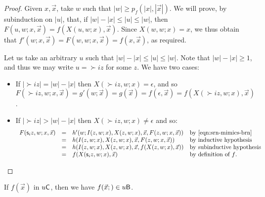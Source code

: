 \documentclass{lmcs}
\begin{document}
\begin{proof}
	Given $x,\vec x$, take $w$ such that $|w|\geq p_f  (|x|,|\vec x|)$. 
	We will prove, by subinduction on $|u|$, that, if $|w|-|x|\leq |u|\leq |w|$, then $F(u,w;x,\vec x) = f(X(u,w;x),\vec x)$. Since $X(w,w;x) = x$, we thus obtain that $f'(w;x,\vec x) = F(w,w;x,\vec x) = f(x,\vec x)$, as required.
	
	Let us take an arbitrary $u$ such that $|w|-|x|\leq |u|\leq |w|$. Note that  $|w|-|x|\geq 1$, and thus we may write $u=\succ i z$ for some $z$. We have two cases:
	\begin{itemize}
		\item
		If $|\succ i z| = |w|-|x|$ then $X(\succ i  z,w;x) = \epsilon$, and so $F(\succ i  z,w;x,\vec x) = g'(w;\vec x) = g(\vec x) = f(\epsilon ,\vec x) = f(X(\succ i z,w;x),\vec x)$.
		\item
		If  $|\succ i z| > |w|-|x|$ then $X(\succ i z,w;x) \neq \epsilon$ and
so:
		\[
		\begin{array}{rcll}
		F(\succ i z,w;x,\vec x) & = & h'(w;I(z,w;x),X(z,w;x),\vec x,F(z,w;x,\vec x)) &  \text{by \eqref{eqn:srn-mimics-brn}} \\
		& = &  h(I(z,w;x),X(z,w;x),\vec x,F(z,w;x,\vec x)) & \text{by inductive hypothesis}\\
		& = & h(I(z,w;x),X(z,w;x),\vec x,f(X(z,w;x),\vec x)) & \text{by subinductive hypothesis}\\
		& = & f(X(\succ i z,w;x),\vec x) & \text{by definition of $f$.}\qedhere
		\end{array}		
		\] 
	\end{itemize}
\end{proof}


\begin{proposition}
	\label{prop:unibc-contains-unicob}
	If $f(\vec x)$ in $\unicob$, then we have $f(\vec x; ) \in \unibc$.
\end{proposition}
\end{document}
